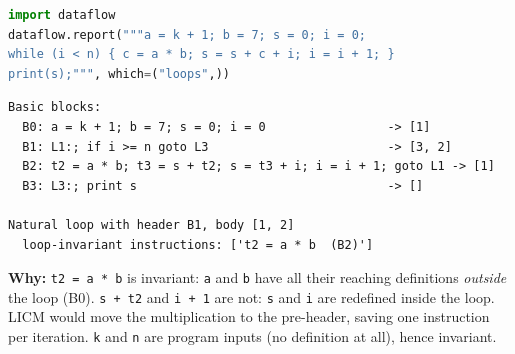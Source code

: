 \documentclass[10pt,a4paper,openany,oneside]{report}
\begin{document}
\begin{lstlisting}[language={Python},title={Natural loop and loop-invariant instruction detection (uses reaching definitions)}]
import dataflow
dataflow.report("""a = k + 1; b = 7; s = 0; i = 0;
while (i < n) { c = a * b; s = s + c + i; i = i + 1; }
print(s);""", which=("loops",))
\end{lstlisting}
\begin{lstlisting}[style=out,title={Captured output}]
Basic blocks:
  B0: a = k + 1; b = 7; s = 0; i = 0                 -> [1]
  B1: L1:; if i >= n goto L3                         -> [3, 2]
  B2: t2 = a * b; t3 = s + t2; s = t3 + i; i = i + 1; goto L1 -> [1]
  B3: L3:; print s                                   -> []

Natural loop with header B1, body [1, 2]
  loop-invariant instructions: ['t2 = a * b  (B2)']
\end{lstlisting}
\textbf{Why:} \texttt{t2 = a * b} is invariant: \texttt{a} and \texttt{b} have all their reaching definitions \emph{outside} the loop (B0). \texttt{s + t2} and \texttt{i + 1} are not: \texttt{s} and \texttt{i} are redefined inside the loop. LICM would move the multiplication to the pre-header, saving one instruction per iteration. \texttt{k} and \texttt{n} are program inputs (no definition at all), hence invariant.
\end{document}
